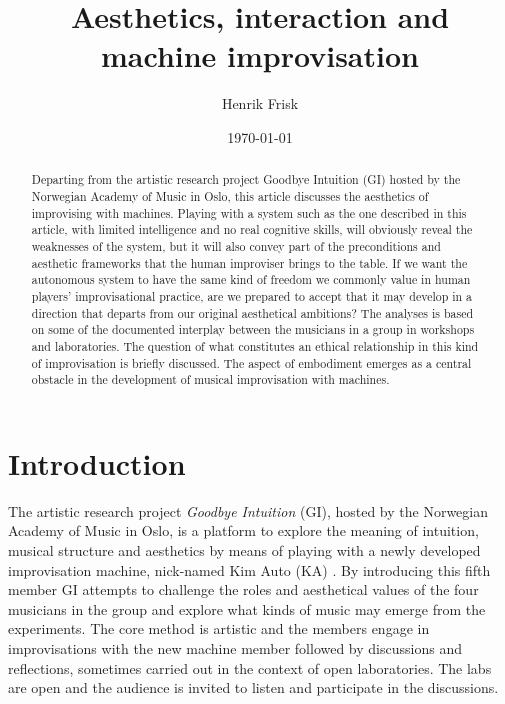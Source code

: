 \documentclass[11pt]{article}
\author{Henrik Frisk}
\date{\today}
\title{Aesthetics, interaction and machine improvisation}
\begin{document}
\maketitle

\begin{abstract}
    Departing from the artistic research project Goodbye Intuition
    (GI) hosted by the Norwegian Academy of Music in Oslo, this
    article discusses the aesthetics of improvising with machines.
    Playing with a system such as the one described in this article,
    with limited intelligence and no real cognitive skills, will
    obviously reveal the weaknesses of the system, but it will also
    convey part of the preconditions and aesthetic frameworks that the
    human improviser brings to the table. If we want the autonomous
    system to have the same kind of freedom we commonly value in human
    players’ improvisational practice, are we prepared to accept that
    it may develop in a direction that departs from our original
    aesthetical ambitions? The analyses is based on some of the
    documented interplay between the musicians in a group in workshops
    and laboratories. The question of what constitutes an ethical
    relationship in this kind of improvisation is briefly
    discussed. The aspect of embodiment emerges as a central obstacle
    in the development of musical improvisation with machines.
\end{abstract}


\section*{Introduction}
\label{sec:org792560d}
The artistic research project \emph{Goodbye Intuition} (GI), hosted by
the Norwegian Academy of Music in Oslo, is a platform to explore the
meaning of intuition, musical structure and aesthetics by means of
playing with a newly developed improvisation machine, nick-named Kim
Auto (KA) \citep{grydeland2018}. By introducing this fifth member GI
attempts to challenge the roles and aesthetical values of the four
musicians in the group and explore what kinds of music may emerge from
the experiments. The core method is artistic and the members engage in
improvisations with the new machine member followed by discussions and
reflections, sometimes carried out in the context of open
laboratories. The labs are open and the audience is invited to listen
and participate in the discussions.
\end{document}
